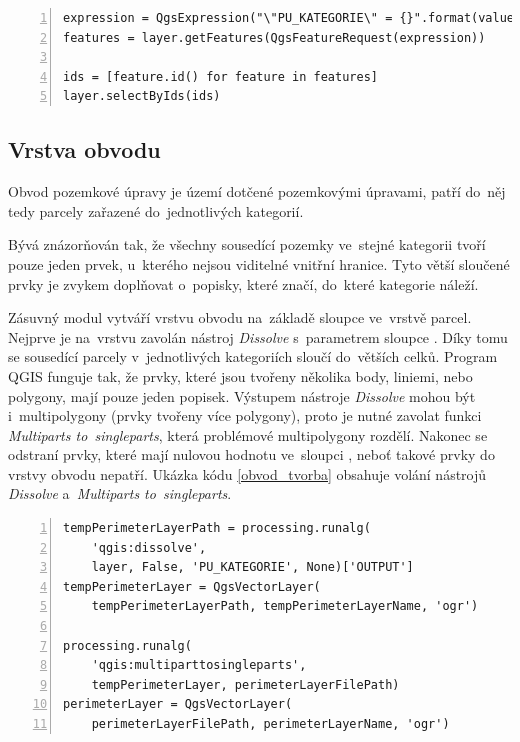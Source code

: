 {\scriptsize
\begin{lstlisting}[style=python, caption={Kategorie parcel~– výběr prvků v~kategorii}, captionpos=b, label=vyber_v_kategorii, backgroundcolor = \color{light-gray},  numbers=left]
expression = QgsExpression("\"PU_KATEGORIE\" = {}".format(value))
features = layer.getFeatures(QgsFeatureRequest(expression))

ids = [feature.id() for feature in features]
layer.selectByIds(ids)
\end{lstlisting}}

\subsection{Vrstva obvodu}
\label{vrstva_obvodu}

Obvod pozemkové úpravy je území dotčené pozemkovými úpravami, patří do~něj tedy parcely zařazené do~jednotlivých kategorií.

Bývá znázorňován tak, že všechny sousedící pozemky ve~stejné kategorii tvoří pouze jeden prvek, u~kterého nejsou viditelné vnitřní hranice. Tyto větší sloučené prvky je zvykem doplňovat o~popisky, které značí, do~které kategorie náleží.

Zásuvný modul vytváří vrstvu obvodu na~základě sloupce \texttt{} ve~vrstvě parcel. Nejprve je na~vrstvu \texttt{} zavolán nástroj \textit{Dissolve} s~parametrem sloupce \texttt{}. Díky tomu se sousedící parcely v~jednotlivých kategoriích sloučí do~větších celků. Program QGIS funguje tak, že prvky, které jsou tvořeny několika body, liniemi, nebo polygony, mají pouze jeden popisek. Výstupem nástroje \textit{Dissolve} mohou být i~multipolygony (prvky tvořeny více polygony), proto je nutné zavolat funkci \textit{Multiparts to~singleparts}, která problémové multipolygony rozdělí. Nakonec se odstraní prvky, které mají nulovou hodnotu ve~sloupci \texttt{}, neboť takové prvky do vrstvy obvodu nepatří. Ukázka kódu \ref{obvod_tvorba} obsahuje volání nástrojů \textit{Dissolve} a~\textit{Multiparts to~singleparts}.

{\scriptsize
\begin{lstlisting}[style=python, caption={Vrstva obvodu~– tvorba}, captionpos=b, label=obvod_tvorba, backgroundcolor = \color{light-gray},  numbers=left]
tempPerimeterLayerPath = processing.runalg(
    'qgis:dissolve',
    layer, False, 'PU_KATEGORIE', None)['OUTPUT']
tempPerimeterLayer = QgsVectorLayer(
    tempPerimeterLayerPath, tempPerimeterLayerName, 'ogr')

processing.runalg(
    'qgis:multiparttosingleparts',
    tempPerimeterLayer, perimeterLayerFilePath)
perimeterLayer = QgsVectorLayer(
    perimeterLayerFilePath, perimeterLayerName, 'ogr')
\end{lstlisting}}

